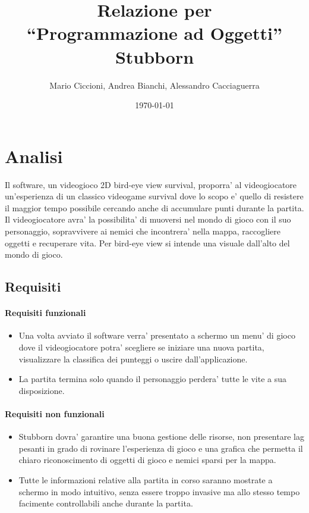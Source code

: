 \documentclass[a4paper,12pt]{report}
\title{Relazione per\\``Programmazione ad Oggetti''\\Stubborn}
\author{Mario Ciccioni, Andrea Bianchi, Alessandro Cacciaguerra}
\date{\today}
\begin{document}
\maketitle

\tableofcontents

\chapter{Analisi}

Il software, un videogioco 2D bird-eye view survival, proporra' al videogiocatore un'esperienza di un classico videogame survival dove lo scopo e' quello di resistere il maggior tempo possibile cercando anche di accumulare punti durante la partita.
Il videogiocatore avra' la possibilita' di muoversi nel mondo di gioco con il suo personaggio, sopravvivere ai nemici che incontrera' nella mappa, raccogliere oggetti e recuperare vita.
Per bird-eye view si intende una visuale dall'alto del mondo di gioco.

\section{Requisiti}

\subsubsection{Requisiti funzionali}
\begin{itemize}
	\item Una volta avviato il software verra' presentato a schermo un menu' di gioco dove il videogiocatore potra' scegliere se iniziare una nuova partita, visualizzare la classifica dei punteggi o uscire dall'applicazione.
    \item La partita termina solo quando il personaggio perdera' tutte le vite a sua disposizione.
\end{itemize}

\subsubsection{Requisiti non funzionali}
\begin{itemize}
	\item Stubborn dovra' garantire una buona gestione delle risorse, non presentare lag pesanti in grado di rovinare l'esperienza di gioco e una grafica che permetta il chiaro riconoscimento di oggetti di gioco e nemici sparsi per la mappa.
    \item Tutte le informazioni relative alla partita in corso saranno mostrate a schermo in modo intuitivo, senza essere troppo invasive ma allo stesso tempo facimente controllabili anche durante la partita. 
\end{itemize}
\end{document}
